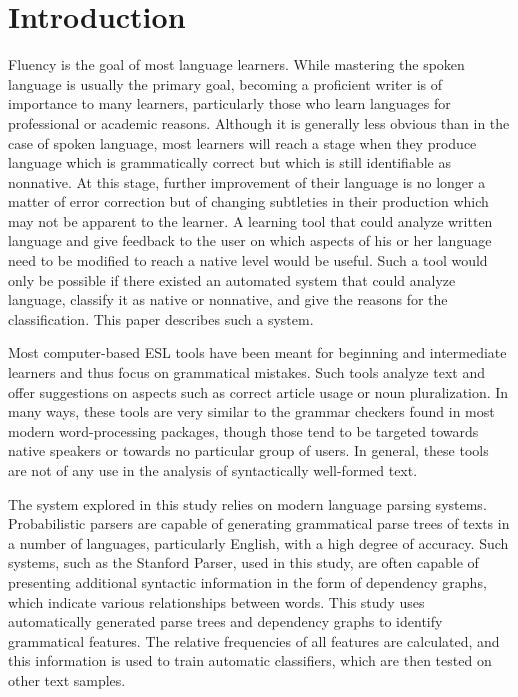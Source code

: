 \documentclass[main.tex]{subfiles}
\begin{document}
\section{Introduction}
\setcounter{section}{1}
Fluency is the goal of most language learners. While mastering the spoken language is usually the primary goal, becoming a proficient writer is of importance to many learners, particularly those who learn languages for professional or academic reasons. Although it is generally less obvious than in the case of spoken language, most learners will reach a stage when they produce language which is grammatically correct but which is still identifiable as nonnative. At this stage, further improvement of their language is no longer a matter of error correction but of changing subtleties in their production which may not be apparent to the learner. A learning tool that could analyze written language and give feedback to the user on which aspects of his or her language need to be modified to reach a native level would be useful. Such a tool would only be possible if there existed an automated system that could analyze language, classify it as native or nonnative, and give the reasons for the classification. This paper describes such a system.

Most computer-based ESL tools have been meant for beginning and intermediate learners and thus focus on grammatical mistakes. Such tools analyze text and offer suggestions on aspects such as correct article usage or noun pluralization. In many ways, these tools are very similar to the grammar checkers found in most modern word-processing packages, though those tend to be targeted towards native speakers or towards no particular group of users. In general, these tools are not of any use in the analysis of syntactically well-formed text.

\begin{comment}
The classification of text documents is a fairly mature technology, often used in categorizing medical and business documents. Little work has been done in applying this technology to second language learning.
\end{comment}

The system explored in this study relies on modern language parsing systems. Probabilistic parsers are capable of generating grammatical parse trees of texts in a number of languages, particularly English, with a high degree of accuracy. Such systems, such as the Stanford Parser, used in this study, are often capable of presenting additional syntactic information in the form of dependency graphs, which indicate various relationships between words. This study uses automatically generated parse trees and dependency graphs to identify grammatical features. The relative frequencies of all features are calculated, and this information is used to train automatic classifiers, which are then tested on other text samples. 
\end{document}
